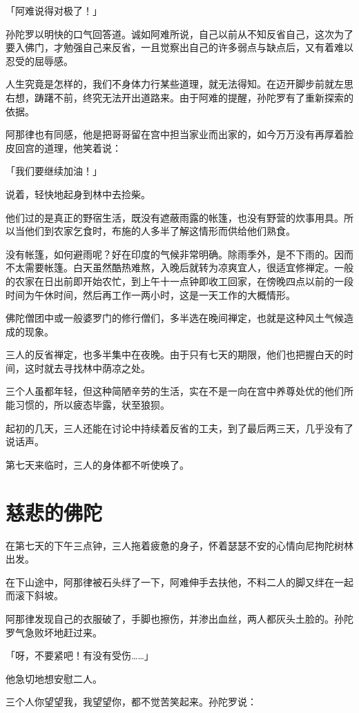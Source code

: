 \documentclass[twoside,openany]{book}
\begin{document}
「阿难说得对极了！」

孙陀罗以明快的口气回答道。诚如阿难所说，自己以前从不知反省自己，这次为了要入佛门，才勉强自己来反省，一且觉察出自己的许多弱点与缺点后，又有着难以忍受的屈辱感。

人生究竟是怎样的，我们不身体力行某些道理，就无法得知。在迈开脚步前就左思右想，踌躇不前，终究无法开出道路来。由于阿难的提醒，孙陀罗有了重新探索的依据。

阿那律也有同感，他是把哥哥留在宫中担当家业而出家的，如今万万没有再厚着脸皮回宫的道理，他笑着说：

「我们要继续加油！」

说着，轻快地起身到林中去捡柴。

他们过的是真正的野宿生活，既没有遮蔽雨露的帐篷，也没有野营的炊事用具。所以当他们到农家乞食时，布施的人多半了解这情形而供给他们熟食。

没有帐篷，如何避雨呢？好在印度的气候非常明确。除雨季外，是不下雨的。因而不太需要帐篷。白天虽然酷热难熬，入晚后就转为凉爽宜人，很适宜修禅定。一般的农家在日出前即开始农忙，到上午十一点钟即收工回家，在傍晚四点以前的一段时间为午休时间，然后再工作一两小时，这是一天工作的大概情形。

佛陀僧团中或一般婆罗门的修行僧们，多半选在晚间禅定，也就是这种风土气候造成的现象。

三人的反省禅定，也多半集中在夜晚。由于只有七天的期限，他们也把握白天的时间，这时就去寻找林中荫凉之处。

三个人虽都年轻，但这种简陋辛劳的生活，实在不是一向在宫中养尊处优的他们所能习惯的，所以疲态毕露，状至狼狈。

起初的几天，三人还能在讨论中持续着反省的工夫，到了最后两三天，几乎没有了说话声。

第七天来临时，三人的身体都不听使唤了。

\section{慈悲的佛陀}\label{sec9.2}

在第七天的下午三点钟，三人拖着疲惫的身子，怀着瑟瑟不安的心情向尼拘陀树林出发。

在下山途中，阿那律被石头绊了一下，阿难伸手去扶他，不料二人的脚又绊在一起而滚下斜坡。

阿那律发现自己的衣服破了，手脚也擦伤，并渗出血丝，两人都灰头土脸的。孙陀罗气急败坏地赶过来。

「呀，不要紧吧！有没有受伤……」

他急切地想安慰二人。

三个人你望望我，我望望你，都不觉苦笑起来。孙陀罗说：
\end{document}
